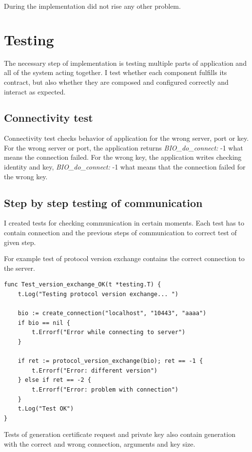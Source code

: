 \documentclass[
  twoside, 12pt, 
  printed, %
  notable,   %
  lof,     %
  lot,     %
]{fithesis3}
\begin{document}
During the implementation did not rise any other problem.

\section{Testing}

The necessary step of implementation is testing multiple parts of application and all of the 
system acting together. I test whether each component fulfills its contract, but also whether they 
are composed and configured correctly and interact as expected. 

\subsection{Connectivity test}

Connectivity test checks behavior of application for the wrong server, port or key. For the wrong 
server or port, the application returns \textit{BIO\_do\_connect:} -1 what means the connection 
failed. For the wrong key, the application writes checking identity and key, 
\textit{BIO\_do\_connect:} -1 what means that the connection failed for the wrong key.

\subsection{Step by step testing of communication}

I created tests for checking communication in certain moments. Each test has to contain connection 
and the previous steps of communication to correct test of given step.

For example test of protocol version exchange contains the correct connection to the server.
\begin{lstlisting}
func Test_version_exchange_OK(t *testing.T) {
	t.Log("Testing protocol version exchange... ")
		
	bio := create_connection("localhost", "10443", "aaaa")
	if bio == nil {
		t.Errorf("Error while connecting to server")
	}
	
	if ret := protocol_version_exchange(bio); ret == -1 {
		t.Errorf("Error: different version")
	} else if ret == -2 {
		t.Errorf("Error: problem with connection")
	} 
	t.Log("Test OK")
}
\end{lstlisting}

Tests of generation certificate request and private key also contain generation with the correct 
and wrong connection, arguments and key size.
\end{document}
